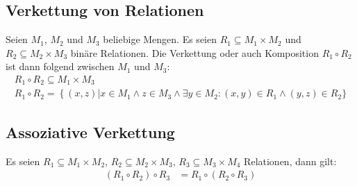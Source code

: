 \subsection{Verkettung von Relationen}\label{subsec:verkettung-von-relationen}
Seien $M_1$, $M_2$ und $M_3$ beliebige Mengen.
Es seien $R_1\subseteq M_1 \times M_2$ und $R_2\subseteq M_2 \times M_3$ binäre Relationen.
Die Verkettung oder auch Komposition $R_1\circ R_2$ ist dann folgend zwischen $M_1$ und $M_3$:\\
\begin{align*}
    R_1\circ R_2\subseteq M_1\times M_3\\
    R_1\circ R_2=\left\{(x,z)|x\in M_1 \wedge z\in M_3 \wedge \exists y\in M_2: (x, y)\in R_1 \wedge (y, z)\in R_2 \}
\end{align*}

\subsection{Assoziative Verkettung}\label{subsec:assoziative-verkettung}
Es seien $R_1\subseteq M_1\times M_2$, $R_2\subseteq M_2\times M_3$, $R_3\subseteq M_3\times M_4$ Relationen, dann gilt:
\begin{align*}
(R_1\circ R_2)
    \circ R_3&=R_1\circ (R_2\circ R_3)
\end{align*}